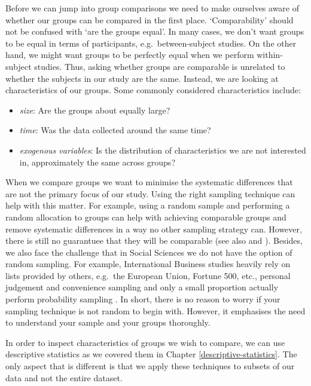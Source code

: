 \documentclass[
]{book}
\begin{document}
Before we can jump into group comparisons we need to make ourselves aware of whether our groups can be compared in the first place. `Comparability' should not be confused with `are the groups equal'. In many cases, we don't want groups to be equal in terms of participants, e.g.~between-subject studies. On the other hand, we might want groups to be perfectly equal when we perform within-subject studies. Thus, asking whether groups are comparable is unrelated to whether the subjects in our study are the same. Instead, we are looking at characteristics of our groups. Some commonly considered characteristics include:

\begin{itemize}
\item
  \emph{size}: Are the groups about equally large?
\item
  \emph{time}: Was the data collected around the same time?
\item
  \emph{exogenous variables}: Is the distribution of characteristics we are not interested in, approximately the same across groups?
\end{itemize}

When we compare groups we want to minimise the systematic differences that are not the primary focus of our study. Using the right sampling technique can help with this matter. For example, using a random sample and performing a random allocation to groups can help with achieving comparable groups and remove systematic differences in a way no other sampling strategy can. However, there is still no guarantuee that they will be comparable (see also \citet{altman1985comparability} and \citet{berger2006review}). Besides, we also face the challenge that in Social Sciences we do not have the option of random sampling. For example, International Business studies heavily rely on lists provided by others, e.g.~the European Union, Fortune 500, etc., personal judgement and convenience sampling and only a small proportion actually perform probability sampling \citep{yang2006-IBmethods}. In short, there is no reason to worry if your sampling technique is not random to begin with. However, it emphasises the need to understand your sample and your groups thoroughly.

In order to inspect characteristics of groups we wish to compare, we can use descriptive statistics as we covered them in Chapter \ref{descriptive-statistics}. The only aspect that is different is that we apply these techniques to subsets of our data and not the entire dataset.
\end{document}
